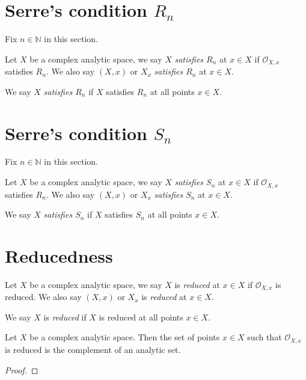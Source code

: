 \section{Serre's condition \texorpdfstring{$R_n$}{Rn}}
Fix $n\in \mathbb{N}$ in this section.
\begin{definition}
    Let $X$ be a complex analytic space, we say $X$ \emph{satisfies $R_n$} at $x\in X$ if $\mathcal{O}_{X,x}$ satisfies $R_n$. We also say $(X,x)$ or $X_x$  \emph{satisfies $R_n$} at $x\in X$.

    We say $X$  \emph{satisfies $R_n$} if $X$ satisfies $R_n$ at all points $x\in X$. 
\end{definition}

\begin{proposition}
    
\end{proposition}

\section{Serre's condition \texorpdfstring{$S_n$}{Sn}}
Fix $n\in \mathbb{N}$ in this section.
\begin{definition}
    Let $X$ be a complex analytic space, we say $X$ \emph{satisfies $S_n$} at $x\in X$ if $\mathcal{O}_{X,x}$ satisfies $R_n$. We also say $(X,x)$ or $X_x$  \emph{satisfies $S_n$} at $x\in X$.

    We say $X$  \emph{satisfies $S_n$} if $X$ satisfies $S_n$ at all points $x\in X$. 
\end{definition}

\begin{proposition}
    
\end{proposition}

\section{Reducedness}
\begin{definition}
    Let $X$ be a complex analytic space, we say $X$ is \emph{reduced} at $x\in X$ if $\mathcal{O}_{X,x}$ is reduced. We also say $(X,x)$ or $X_x$ is \emph{reduced} at $x\in X$.

    We say $X$ is \emph{reduced} if $X$ is reduced at all points $x\in X$. 
\end{definition}

\begin{thm}\label{thm-reducedlocusopen}
    Let $X$ be a complex analytic space. Then the set of points $x\in X$ such that $\mathcal{O}_{X,x}$ is reduced is the complement of an analytic set.
\end{thm}
\begin{proof}
    
\end{proof}

